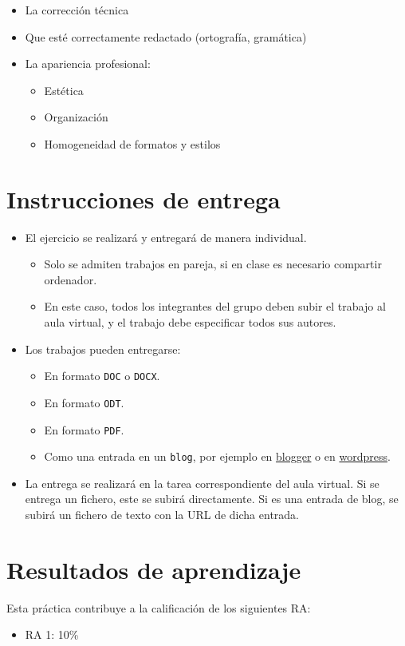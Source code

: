 \documentclass[a4paper]{article}
\begin{document}
\begin{itemize}
\item La corrección técnica
\item Que esté correctamente redactado (ortografía, gramática)
\item La apariencia profesional:
\begin{itemize}
\item Estética
\item Organización
\item Homogeneidad de formatos y estilos
\end{itemize}
\end{itemize}
\section{Instrucciones de entrega}
\label{sec:org0000012}

\begin{itemize}
\item El ejercicio se realizará y entregará de manera individual.

\begin{itemize}
\item Solo se admiten trabajos en pareja, si en clase es necesario compartir ordenador.
\item En este caso, todos los integrantes del grupo deben subir el trabajo al aula virtual, y el trabajo debe especificar todos sus autores.
\end{itemize}
\end{itemize}


\begin{itemize}
\item Los trabajos pueden entregarse:
\begin{itemize}
\item En formato \texttt{DOC} o \texttt{DOCX}.
\item En formato \texttt{ODT}.
\item En formato \texttt{PDF}.
\item Como una entrada en un \texttt{blog}, por ejemplo en \href{https://www.blogger.com/}{blogger} o en \href{https://wordpress.com/es/}{wordpress}.
\end{itemize}
\end{itemize}


\begin{itemize}
\item La entrega se realizará en la tarea correspondiente del aula virtual. Si se entrega un fichero, este se subirá directamente. Si es una entrada de blog, se subirá un fichero de texto con la URL de dicha entrada.
\end{itemize}
\section{Resultados de aprendizaje}
\label{sec:org0000015}
Esta práctica contribuye a la calificación de los siguientes RA:
\begin{itemize}
\item RA 1: 10\%
\end{itemize}
\end{document}
